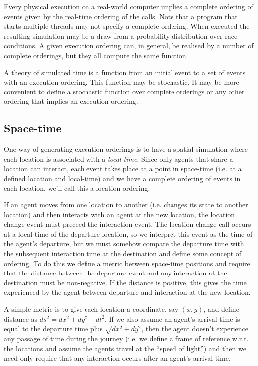 \documentclass[a4paper]{article}
\begin{document}
Every physical execution on a real-world computer implies a complete ordering of events given by the real-time ordering of the calls. Note that a program that starts multiple threads may not specify a complete ordering. When executed the resulting simulation may be a draw from a probability distribution over race conditions. A given execution ordering can, in general, be realised by a number of complete orderings, but they all compute the same function.

A theory of simulated time is a function from an initial event to a set of events with an execution ordering. This function may be stochastic. It may be more convenient to define a stochastic function over complete orderings or any other ordering that implies an execution ordering.

\subsection{Space-time}

One way of generating execution orderings is to have a spatial simulation where each location is associated with a \textit{local time}. Since only agents that share a location can interact, each event takes place at a point in space-time (i.e. at a defined location and local-time) and we have a complete ordering of events in each location, we'll call this a location ordering.

If an agent moves from one location to another (i.e. changes its state to another location) and then interacts with an agent at the new location, the location change event must preceed the interaction event. The location-change call occurs at a local time of the departure location, so we interpret this event as the time of the agent's departure, but we must somehow compare the departure time with the subsequent interaction time at the destination and define some concept of ordering. To do this we define a metric between space-time positions and require that the distance between the departure event and any interaction at the destination must be non-negative. If the distance is positive, this gives the time experienced by the agent between departure and interaction at the new location.

A simple metric is to give each location a coordinate, say $(x,y)$, and define distance as $ds^2 = dx^2 + dy^2 - dt^2$. If we also assume an agent's arrival time is equal to the departure time plus $\sqrt{dx^2 + dy^2}$, then the agent doesn't experience any passage of time during the journey (i.e. we define a frame of reference w.r.t. the locations and assume the agents travel at the ``speed of light'') and then we need only require that any interaction occurs after an agent's arrival time.
\end{document}
